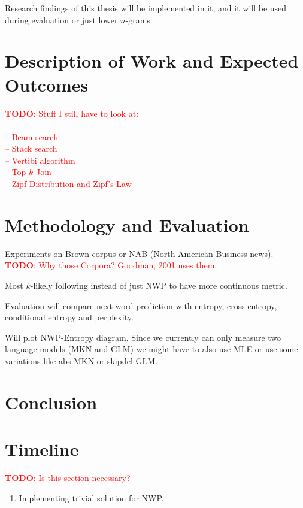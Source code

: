 \documentclass[11pt,a4paper]{article}
\newcommand{\todo}[1]{\textcolor{red}{\textbf{TODO}: #1}}
\begin{document}
Research findings of this thesis will be implemented in it, and it will be used
during evaluation or just lower $n$-grams.

\section{Description of Work and Expected Outcomes}

\todo{Stuff I still have to look at:\\
\\
-- Beam search \\
-- Stack search \\
-- Vertibi algorithm \\
-- Top $k$-Join \\
-- Zipf Distribution and Zipf's Law
}

\section{Methodology and Evaluation}

Experiments on Brown corpus or NAB (North American Business news).
\todo{Why those Corpora? Goodman, 2001 uses them.}

Most $k$-likely following instead of just NWP to have more continuous metric.

Evaluation will compare next word prediction with entropy, cross-entropy,
conditional entropy and perplexity.

Will plot NWP-Entropy diagram. Since we currently can only measure two language
models (MKN and GLM) we might have to also use MLE or use some variations like
abs-MKN or skipdel-GLM.

\section{Conclusion}

\section{Timeline}

\todo{Is this section necessary?}

\begin{enumerate}
  \item Implementing trivial solution for NWP.
\end{enumerate}
\end{document}

